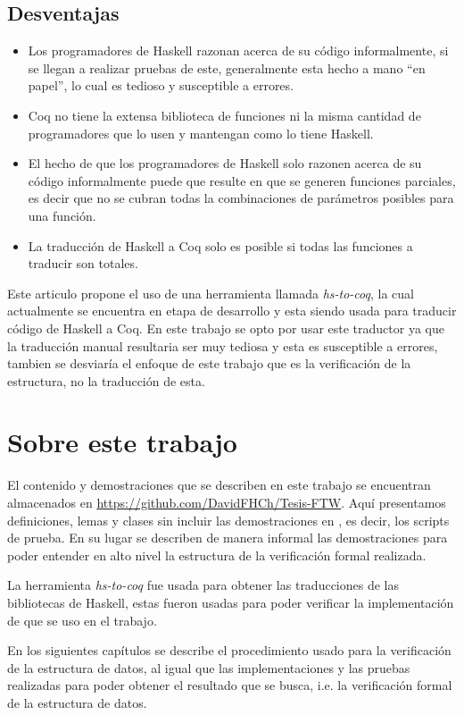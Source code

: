 \subsection{Desventajas}
\begin{itemize}
    \item Los programadores de Haskell razonan acerca de su código informalmente, si se llegan a
    realizar pruebas de este, generalmente esta hecho a mano ``en papel'', lo cual es tedioso y
    susceptible a errores.
    \item Coq no tiene la extensa biblioteca de funciones ni la misma cantidad de programadores
    que lo usen y mantengan como lo tiene Haskell.
    \item El hecho de que los programadores de Haskell solo razonen acerca de su código
    informalmente puede que resulte en que se generen funciones parciales, es decir que no se
    cubran todas la combinaciones de parámetros posibles para una funci\'on.
    \item La traducci\'on de Haskell a Coq solo es posible si todas las funciones a traducir son
    totales.
\end{itemize}

Este articulo propone el uso de una herramienta llamada \textit{hs-to-coq}, la cual actualmente se
encuentra en etapa de desarrollo y esta siendo usada para traducir código de Haskell a Coq. En este
trabajo se opto por usar este traductor ya que la traducci\'on manual resultaria ser muy tediosa y
esta es susceptible a errores, tambien se desviaría el enfoque de este trabajo que es la
verificaci\'on de la estructura, no la traducci\'on de esta.

\section{Sobre este trabajo}
El contenido y demostraciones que se describen en este trabajo se encuentran almacenados en
\url{https://github.com/DavidFHCh/Tesis-FTW}. Aqu\'i presentamos definiciones, lemas y clases sin
incluir las demostraciones en {\coq}, es decir, los scripts de prueba. En su lugar se describen de
manera informal las demostraciones para poder entender en alto nivel la estructura de la
verificaci\'on formal realizada.

La herramienta \textit{hs-to-coq} fue usada para obtener las traducciones de las bibliotecas de
Haskell, estas fueron usadas para poder verificar la implementación de {\arns} \cite{MSetRBT} que
se uso en el trabajo.

En los siguientes capítulos se describe el procedimiento usado para la verificaci\'on de la
estructura de datos, al igual que las implementaciones y las pruebas realizadas para poder obtener
el resultado que se busca, i.e. la verificación formal de la estructura de datos.
